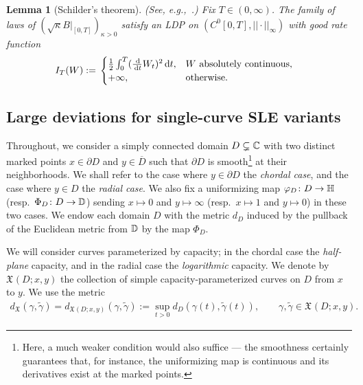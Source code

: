 \documentclass[a4paper, 11pt]{article}
\newtheorem{lemA}[theorem]{Lemma}
\theoremstyle{definition}
\numberwithin{equation}{section}
\numberwithin{figure}{section}
\newcommand{\BMenergy}[1][]{I_{#1}}%
\newcommand{\funs}[2][]{C^{0}_{#1}[0,#2}
\newcommand{\Xpaths}[1][]{\mathfrak{X}_{#1}}
\newcommand{\norm}[1]{|\!|#1|\!|}
\newcommand{\normUniform}[1]{\norm{#1}_\infty}
\newcommand{\dXpaths}[1][]{d_{\Xpaths[#1]}}
\begin{document}
\begin{lemA}[{Schilder's theorem}] \textnormal{(See, e.g.,~\cite[Theorem~5.2.3]{Dembo-Zeitouni:Large_deviations_techniques_and_applications}.)}
\label{thm:Schilders-theorem}
Fix $T \in (0,\infty)$. 
The family of laws of $(\sqrt{\kappa}B|_{[0,T]})_{\kappa > 0}$ 
satisfy an LDP on $(\funs{T]},\normUniform{\cdot})$ with good rate function 
\begin{align}\label{eq:Dirichlet energy}
\BMenergy[T](W) := \; & \begin{cases}
\frac{1}{2}\int_0^T (\frac{\ud}{\ud t} W_t)^2 \ud t, & W \textnormal{ absolutely continuous},\\
+ \infty , & \textnormal{otherwise}.
\end{cases}
\end{align}
\end{lemA}


\subsection{Large deviations for single-curve SLE variants}


Throughout, we consider a simply connected domain $D \subsetneq \mathbb{C}$ 
with two distinct marked points $x \in \partial D$ and $y \in \overline{D}$
such that $\partial D$ is smooth\footnote{Here, a much weaker condition would also suffice --- the smoothness certainly guarantees that, for instance, the uniformizing map is continuous and its derivatives exist at the marked points.} at their neighborhoods.
We shall refer to the case where $y \in \partial D$ the \emph{chordal case}, 
and the case where $y \in D$ the \emph{radial case}.  
We also fix a uniformizing map $\varphi_D \colon D \to \mathbb{H}$ (resp.~$\Phi_D \colon D \to \mathbb{D}$) 
sending $x \mapsto 0$ and $y \mapsto \infty$
(resp.~$x \mapsto 1$ and $y \mapsto 0$) in these two cases.
We endow each domain $D$ with the metric $d_D$ 
induced by the pullback of the Euclidean metric from $\mathbb{D}$ by the map $\Phi_D$.



We will consider curves parameterized by capacity; 
in the chordal case the \emph{half-plane} capacity, and in the radial case the \emph{logarithmic} capacity.
We denote by $\Xpaths(D;x,y)$ the collection of simple capacity-parameterized curves on $D$ from $x$ to $y$.
We use the metric 
\begin{align*}
\dXpaths(\gamma, \tilde{\gamma}) 
= d_{\Xpaths(D;x,y)}(\gamma, \tilde{\gamma} ) 
:= \sup_{t > 0} d_D(\gamma(t),\tilde{\gamma}(t)) 
, \qquad \gamma, \tilde{\gamma}  \in \Xpaths(D;x,y) .
\end{align*}
\end{document}
